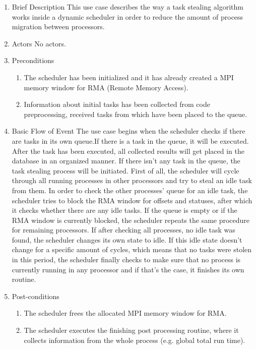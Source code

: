 \begin{enumerate}[1. ]


\item Brief Description
\newline
This use case describes the way a task stealing algorithm works inside a dynamic scheduler in order to reduce the amount of process migration between processors.

\item Actors
\newline
No actors. 


\item Preconditions
\begin{enumerate}
\item The scheduler has been initialized and it has already created a MPI memory window for RMA (Remote Memory Access).
\item Information about initial tasks has been collected from code preprocessing, received tasks from which have been placed to the queue.
\end{enumerate}

\item Basic Flow of Event
\newline
The use case begins when the scheduler checks if there are tasks in its own queue.If there is a task in the queue, it will be executed. After the task has been executed, all collected results will get placed in the database in an organized manner.
If there isn't any task in the queue, the task stealing process will be initiated. First of all, the scheduler will cycle through all running processes in other processors and try to steal an idle task from them. In order to check the other processes' queue for an idle task, the scheduler tries to block the RMA window for offsets and statuses, after which it checks whether there are any idle tasks. If the queue is empty or if the RMA window is currently blocked, the scheduler repeats the same procedure for remaining processors. If after checking all processes, no idle task was found, the scheduler changes its own state to idle. If this idle state doesn't change for a specific amount of cycles, which means that no tasks were stolen in this period, the scheduler finally checks to make sure that no process is currently running in any processor and if that's the case, it finishes its own routine. 


\item Post-conditions
\begin{enumerate}
\item The scheduler frees the allocated MPI memory window for RMA.
\item The scheduler executes the finishing post processing routine, where it collects information from the whole process (e.g. global total run time).
\end{enumerate}


\end{enumerate}
